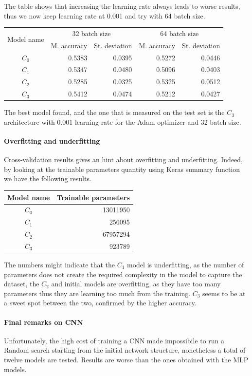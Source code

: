 The table shows that increasing the learning rate always leads to worse results, thus 
we now keep learning rate at 0.001 and try with 64 batch size.

\begin{center}
    \begin{tabular}{ |c|r|r|r|r| } 
        \hline
        \multirow{2}{*}{Model name} & \multicolumn{2}{c|}{32 batch size} & \multicolumn{2}{c|}{64 batch size}  \\
        \cline{2-5}
        & M. accuracy & St. deviation & M. accuracy & St. deviation \\
        \hline
        $C_0$ & 0.5383 & 0.0395 & 0.5272 & 0.0446 \\
        $C_1$ & 0.5347 & 0.0480 & 0.5096 & 0.0403 \\
        $C_2$ & 0.5285 & 0.0325 & 0.5325 & 0.0512 \\
        $C_3$ & 0.5412 & 0.0474 & 0.5212 & 0.0427 \\
        \hline
    \end{tabular}
\end{center}

The best model found, and the one that is measured on the test set is 
the $C_3$ architecture with 0.001 learning rate for the Adam optimizer
and 32 batch size.

\paragraph{Overfitting and underfitting}
Cross-validation results gives an hint about overfitting and underfitting. Indeed, 
by looking at the trainable parameters quantity using Keras summary function we have the following results.
\begin{center}
    \begin{tabular}{ |c|r| } 
        \hline
        Model name & Trainable parameters\\
        \hline
        $C_0$ & 13011950 \\
        $C_1$ & 256095 \\
        $C_2$ & 67957294 \\
        $C_3$ & 923789 \\
        \hline
    \end{tabular}
\end{center}
The numbers might indicate that the $C_1$ model is underfitting, as the number 
of parameters does not create the required complexity in the model to capture the dataset, 
the $C_2$ and initial models are overfitting, as they have too many parameters 
thus they are learning too much from the training. 
$C_3$ seems to be at a sweet spot between the two, confirmed by the higher accuracy.

\paragraph{Final remarks on CNN}
Unfortunately, the high cost of training a CNN made impossibile to run a Random search 
starting from the initial network structure, nonetheless a total 
of twelve models are tested. Results are worse than the ones obtained 
with the MLP models. 
\newpage